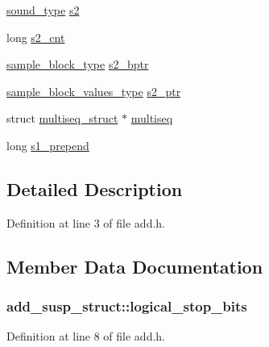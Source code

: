 \begin{DoxyCompactItemize}
\item 
\hyperlink{sound_8h_a792cec4ed9d6d636d342d9365ba265ea}{sound\+\_\+type} \hyperlink{structadd__susp__struct_a7996852fa45251733bcc3f354a80b61b}{s2}
\item 
long \hyperlink{structadd__susp__struct_af0e36f9b3e348a1510387c5941c9f049}{s2\+\_\+cnt}
\item 
\hyperlink{sound_8h_a6becaef7eb98c0e45b13f72dadf07b23}{sample\+\_\+block\+\_\+type} \hyperlink{structadd__susp__struct_a6efe9857c710fff11ab1dfac622be7c5}{s2\+\_\+bptr}
\item 
\hyperlink{sound_8h_a83d17f7b465d1591f27cd28fc5eb8a03}{sample\+\_\+block\+\_\+values\+\_\+type} \hyperlink{structadd__susp__struct_a21384f0477e3fbd3c873544c704988e5}{s2\+\_\+ptr}
\item 
struct \hyperlink{structmultiseq__struct}{multiseq\+\_\+struct} $\ast$ \hyperlink{structadd__susp__struct_a93d74bb0c9caf29070bf7100adda5925}{multiseq}
\item 
long \hyperlink{structadd__susp__struct_a3a5985ce08a9c25799cfa67a1b59065d}{s1\+\_\+prepend}
\end{DoxyCompactItemize}


\subsection{Detailed Description}


Definition at line 3 of file add.\+h.



\subsection{Member Data Documentation}
\subsubsection[{\texorpdfstring{logical\+\_\+stop\+\_\+bits}{logical_stop_bits}}]{ add\+\_\+susp\+\_\+struct\+::logical\+\_\+stop\+\_\+bits}\hypertarget{structadd__susp__struct_af9e04e08141e785c5096e214427c001e}{}\label{structadd__susp__struct_af9e04e08141e785c5096e214427c001e}


Definition at line 8 of file add.\+h.

